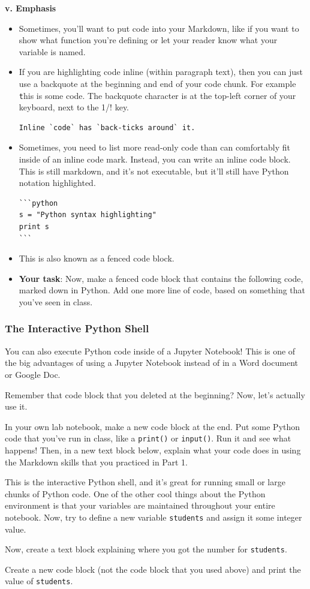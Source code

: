 \textbf{v. Emphasis}
\begin{itemize}
	\item Sometimes, you'll want to put code into your Markdown, like if you want to show what function you're defining or let your reader know what your variable is named.
	\item If you are highlighting code inline (within paragraph text), then you can just use a backquote at the beginning and end of your code chunk. For example {\texttt this} is some code. The backquote character is at the top-left corner of your keyboard, next to the 1/! key.
	\begin{lstlisting}[style=none]
Inline `code` has `back-ticks around` it.
	\end{lstlisting}
	\item Sometimes, you need to list more read-only code than can comfortably fit inside of an inline code mark. Instead, you can write an inline code block. This is still markdown, and it's not executable, but it'll still have Python notation highlighted.
	\begin{lstlisting}[style=none]
```python
s = "Python syntax highlighting"
print s
```
	\end{lstlisting}
	\item This is also known as a fenced code block.
	\item \textbf{Your task}: Now, make a fenced code block that contains the following code, marked down in Python. Add one more line of code, based on something that you've seen in class.
\end{itemize}
\subsubsection*{The Interactive Python Shell}
You can also execute Python code inside of a Jupyter Notebook! This is one of the big advantages of using a Jupyter Notebook instead of in a Word document or Google Doc.\par
Remember that code block that you deleted at the beginning? Now, let's actually use it.\par
In your own lab notebook, make a new code block at the end. Put some Python code that you've run in class, like a \verb|print()| or \verb|input()|. Run it and see what happens! Then, in a new text block below, explain what your code does in using the Markdown skills that you practiced in Part 1.\par
This is the interactive Python shell, and it's great for running small or large chunks of Python code. One of the other cool things about the Python environment is that your variables are maintained throughout your entire notebook. Now, try to define a new variable \verb|students| and assign it some integer value.\par
Now, create a text block explaining where you got the number for \verb|students|.\par
Create a new code block (not the code block that you used above) and print the value of \verb|students|.\par
